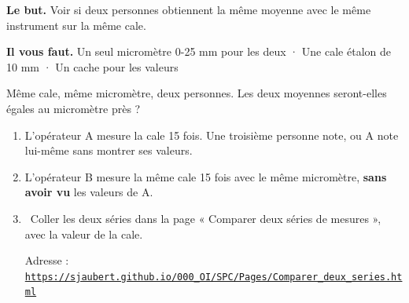\documentclass[10pt,a4paper]{article}
\begin{document}
\thispagestyle{fancy}
\begin{tcolorbox}[boite]\textbf{Le but.} Voir si deux personnes obtiennent la même moyenne avec le même instrument sur la même cale.\par\textbf{Il vous faut.} Un seul micromètre 0-25 mm pour les deux · Une cale étalon de 10 mm · Un cache pour les valeurs\end{tcolorbox}
\begin{tcolorbox}[pred]Même cale, même micromètre, deux personnes. Les deux moyennes seront-elles égales au micromètre près ?\reponse\end{tcolorbox}
\begin{enumerate}[label=\textcolor{cyan}{\textbf{\arabic*.}},leftmargin=15pt,itemsep=1.5pt]
\item L'opérateur A mesure la cale 15 fois. Une troisième personne note, ou A note lui-même sans montrer ses valeurs.
\item L'opérateur B mesure la même cale 15 fois avec le même micromètre, \textbf{sans avoir vu} les valeurs de A.
\item \tagW\ Coller les deux séries dans la page « Comparer deux séries de mesures », avec la valeur de la cale.\par Adresse : \href{https://sjaubert.github.io/000_OI/SPC/Pages/Comparer_deux_series.html}{\nolinkurl{https://sjaubert.github.io/000_OI/SPC/Pages/Comparer_deux_series.html}}
\end{enumerate}
\end{document}
